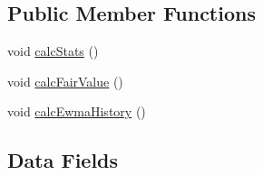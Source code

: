 \subsection*{Public Member Functions}
\begin{DoxyCompactItemize}
\item 
void \hyperlink{class_k_1_1_m_g_a785796c4aff2e5bddf071efeb14a5f8a}{calc\+Stats} ()
\item 
void \hyperlink{class_k_1_1_m_g_a015722c233590fa0304b0459417dfc6b}{calc\+Fair\+Value} ()
\item 
void \hyperlink{class_k_1_1_m_g_aad02ad8dba997ebd2f1e03a94d7b8633}{calc\+Ewma\+History} ()
\end{DoxyCompactItemize}
\subsection*{Data Fields}
